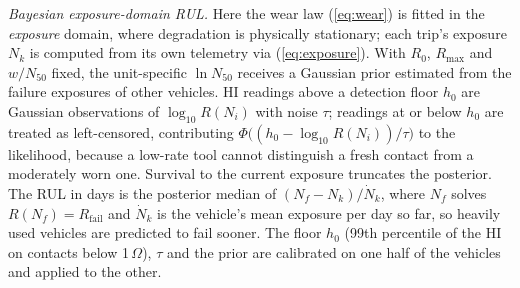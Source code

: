 \emph{Bayesian exposure-domain RUL.} Here the wear law (\ref{eq:wear}) is
fitted in the \emph{exposure} domain, where degradation is physically
stationary; each trip's exposure $N_k$ is computed from its own telemetry
via (\ref{eq:exposure}). With $R_0$, $R_{\max}$ and $w/N_{50}$ fixed, the
unit-specific $\ln N_{50}$ receives a Gaussian prior estimated from the
failure exposures of other vehicles. HI readings above a detection floor
$h_0$ are Gaussian observations of $\log_{10}R(N_i)$ with noise $\tau$;
readings at or below $h_0$ are treated as left-censored, contributing
$\Phi\big((h_0-\log_{10}R(N_i))/\tau\big)$ to the likelihood, because a
low-rate tool cannot distinguish a fresh contact from a moderately worn
one. Survival to the current exposure truncates the posterior. The RUL in
days is the posterior median of $(N_f-N_k)/\dot N_k$, where $N_f$ solves
$R(N_f)=R_{\mathrm{fail}}$ and $\dot N_k$ is the vehicle's mean exposure
per day so far, so heavily used vehicles are predicted to fail sooner.
The floor $h_0$ (99th percentile of the HI on contacts below
1\,$\Omega$), $\tau$ and the prior are calibrated on one half of the
vehicles and applied to the other.
